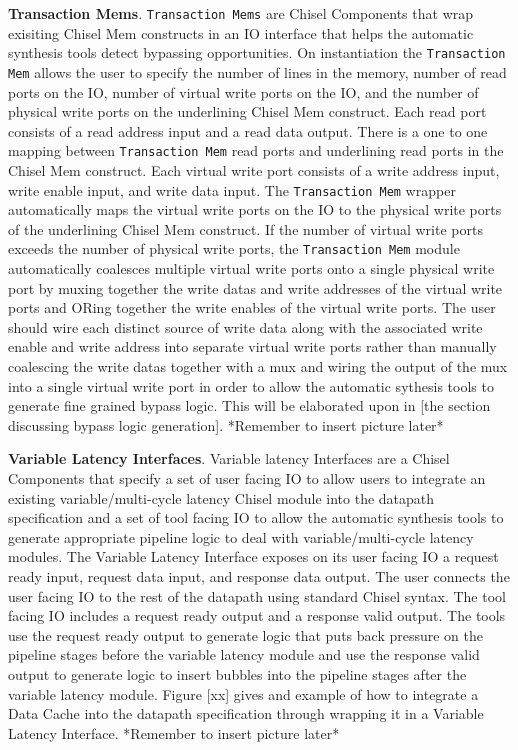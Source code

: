 {\bf Transaction Mems}. {\tt Transaction Mems} are Chisel Components that
wrap exisiting Chisel Mem constructs in an IO interface that helps the
automatic synthesis tools detect bypassing opportunities. On
instantiation the {\tt Transaction Mem} allows the user to specify the
number of lines in the memory, number of read ports on the IO, number
of virtual write ports on the IO, and the number of physical write
ports on the underlining Chisel Mem construct. Each read port consists
of a read address input and a read data output. There is a one to one
mapping between {\tt Transaction Mem} read ports and underlining read ports
in the Chisel Mem construct. Each virtual write port consists of a
write address input, write enable input, and write data input. The
{\tt Transaction Mem} wrapper automatically maps the virtual write ports on
the IO to the physical write ports of the underlining Chisel Mem
construct. If the number of virtual write ports exceeds the number of
physical write ports, the {\tt Transaction Mem} module automatically
coalesces multiple virtual write ports onto a single physical write
port by muxing together the write datas and write addresses of the
virtual write ports and ORing together the write enables of the
virtual write ports. The user should wire each distinct source of
write data along with the associated write enable and write address
into separate virtual write ports rather than manually coalescing the
write datas together with a mux and wiring the output of the mux into
a single virtual write port in order to allow the automatic sythesis
tools to generate fine grained bypass logic. This will be elaborated
upon in [the section discussing bypass logic generation]. *Remember to
insert picture later*

{\bf Variable Latency Interfaces}. Variable latency Interfaces are a
Chisel Components that specify a set of user facing IO to allow users
to integrate an existing variable/multi-cycle latency Chisel module
into the datapath specification and a set of tool facing IO to allow
the automatic synthesis tools to generate appropriate pipeline logic
to deal with variable/multi-cycle latency modules. The Variable
Latency Interface exposes on its user facing IO a request ready input,
request data input, and response data output. The user connects the
user facing IO to the rest of the datapath using standard Chisel
syntax. The tool facing IO includes a request ready output and a
response valid output. The tools use the request ready output to
generate logic that puts back pressure on the pipeline stages before
the variable latency module and use the response valid output to
generate logic to insert bubbles into the pipeline stages after the
variable latency module. Figure [xx] gives and example of how to
integrate a Data Cache into the datapath specification through
wrapping it in a Variable Latency Interface. *Remember to insert
picture later*

